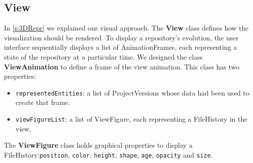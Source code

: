 \subsection*{View}
\label{s:view_impl}
In \autoref{s:3DRepr} we explained our visual approach. The \textbf{View} class defines how the visualization should be rendered. 
To display a repository's evolution, the user interface sequentially displays a list of AnimationFrames, each representing a state of the repository at a particular time. We designed the class \textbf{ViewAnimation} to define a frame of the view animation. This class has two properties:
\begin{itemize}
    \item \texttt{representedEntities}: a list of ProjectVersions whose data had been used to create that frame.
    \item \texttt{viewFigureList}: a list of ViewFigure, each representing a FileHistory in the view.
\end{itemize}

The \textbf{ViewFigure} class holds graphical properties to display a FileHistory:\texttt{position}, \texttt{color}, \texttt{height}, \texttt{shape}, \texttt{age}, \texttt{opacity} and \texttt{size}.

